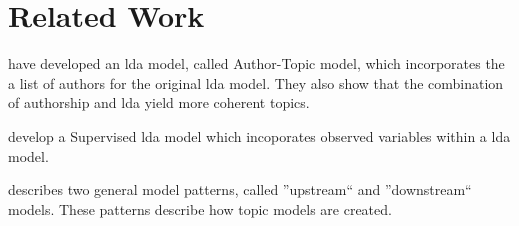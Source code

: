 \section{Related Work}

\citet{author_topic_2012} have developed an \gls{lda} model, called Author-Topic model, which incorporates the a list of authors for the original \gls{lda} model. 
They also show that the combination of authorship and \gls{lda} yield more coherent topics.


\citet{blei2010supervised} develop a Supervised \gls{lda} model which incoporates observed variables within a \gls{lda} model.


\citet{mimno2008topic} describes two general model patterns, called ''upstream`` and ''downstream`` models.
These patterns describe how topic models are created.
